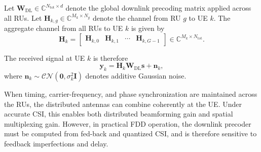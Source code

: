 \documentclass[lettersize,journal]{IEEEtran}
\begin{document}
Let $\mathbf{W}_{\mathrm{DL}} \in \mathbb{C}^{N_{\mathrm{tot}}\times d}$ denote the global downlink precoding matrix applied across all RUs. Let $\mathbf{H}_{k,g} \in \mathbb{C}^{M_k\times N_g}$ denote the channel from RU $g$ to UE $k$. The aggregate channel from all RUs to UE $k$ is given by
\begin{equation}
\mathbf{H}_k
=
\begin{bmatrix}
\mathbf{H}_{k,0} & \mathbf{H}_{k,1} & \cdots & \mathbf{H}_{k,G-1}
\end{bmatrix}
\in \mathbb{C}^{M_k\times N_{\mathrm{tot}}}.
\label{eq:agg_channel}
\end{equation}

The received signal at UE $k$ is therefore
\begin{equation}
\mathbf{y}_k
=
\mathbf{H}_k \mathbf{W}_{\mathrm{DL}} \mathbf{s}
+
\mathbf{n}_k,
\label{eq:cjt_rx_signal}
\end{equation}
where $\mathbf{n}_k \sim \mathcal{CN}(\mathbf{0},\sigma_k^2\mathbf{I})$ denotes additive Gaussian noise.

When timing, carrier-frequency, and phase synchronization are maintained across the RUs, the distributed antennas can combine coherently at the UE. Under accurate CSI, this enables both distributed beamforming gain and spatial multiplexing gain. However, in practical FDD operation, the downlink precoder must be computed from fed-back and quantized CSI, and is therefore sensitive to feedback imperfections and delay.



\end{document}
